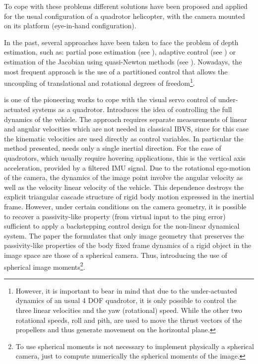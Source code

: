 To cope with these problems different solutions have been proposed and applied for the usual configuration of a quadrotor helicopter, with the camera mounted on its platform (eye-in-hand configuration).

 In the past, several approaches have been taken to face the problem of depth estimation, such as: partial pose estimation (see \cite{malis_2_1999}), adaptive control (see \cite{Papanikolopoulos}) or estimation of the Jacobian using quasi-Newton methods (see \cite{Piepmeier}). Nowadays, the most frequent approach is the use of a partitioned control that allows the uncoupling of translational and rotational degrees of freedom\footnote{However, it is important to bear in mind that due to the under-actuated dynamics of an usual 4 DOF quadrotor, it is only possible to control the three linear velocities and the yaw (rotational) speed. While the other two rotational speeds, roll and pith, are used to move the thrust vectors of the propellers and thus generate movement on the horizontal plane.}.
 
 \cite{hamel_2002} is one of the pioneering works to cope with the visual servo control of under-actuated systems as a quadrotor. Introduces the idea of controlling the full dynamics of the vehicle. The approach requires separate measurements of linear and angular velocities which are not needed in classical IBVS, since for this case the kinematic velocities are used directly as control variables. In particular the method presented, needs only a single inertial direction. For the case of quadrotors, which usually require hovering applications, this is the vertical axis acceleration, provided by a filtered IMU signal. Due to the rotational ego-motion of the camera, the dynamics of the image point involve the angular velocity as well as the velocity linear velocity of the vehicle. This dependence destroys the explicit triangular cascade structure of rigid body motion expressed in the inertial frame. However, under certain conditions on the camera geometry, it is possible to recover a passivity-like property (from virtual input to the 
 ping error) sufficient to apply a backstepping control design for the non-linear dynamical system. The paper the formulates that only image geometry that preserves the passivity-like properties of the body fixed frame dynamics of a rigid object in the image space are those of a spherical camera. Thus, introducing the use of spherical image moments\footnote{To use spherical moments is not necessary to implement physically a spherical camera, just to compute numerically the spherical moments of the image.}.

